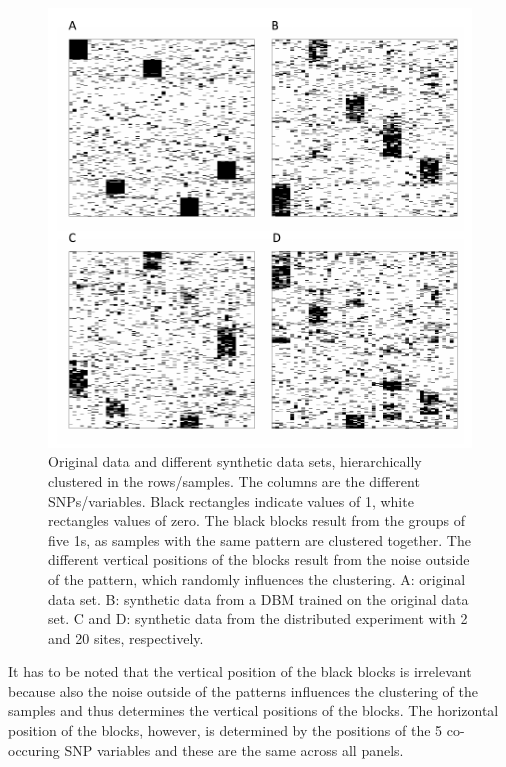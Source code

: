 \documentclass[12pt]{article}
\begin{document}
 \begin{figure}[!hb]
   \centering
   \includegraphics[scale=1]{images/hclust.pdf}
   \caption{Original data and different synthetic data sets, hierarchically clustered in the rows/samples. The columns are the different SNPs/variables. Black rectangles indicate values of 1, white rectangles values of zero. The black blocks result from the groups of five 1s, as samples with the same pattern are clustered together. The different vertical positions of the blocks result from the noise outside of the pattern, which randomly influences the clustering. A: original data set. B: synthetic data from a DBM trained on the original data set. C and D: synthetic data from the distributed experiment with 2 and 20 sites, respectively.}
   \label{fig:distclustersnps}
 \end{figure}

It has to be noted that the vertical position of the black blocks is irrelevant because also the noise outside of the patterns influences the clustering of the samples and thus determines the vertical positions of the blocks.
The horizontal position of the blocks, however, is determined by the positions of the 5 co-occuring SNP variables and these are the same across all panels.
\end{document}
